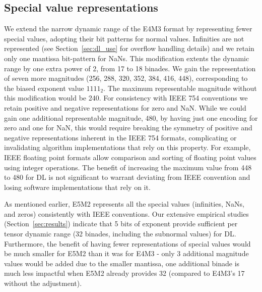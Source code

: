 \subsection{Special value representations}
\label{sec:special_values}
We extend the narrow dynamic range of the E4M3 format by representing fewer special values, adopting their bit patterns for normal values. Infinities are not represented (see Section~\ref{sec:dl_use} for overflow handling details) and we retain only one mantissa bit-pattern for NaNs. This modification extents the dynamic range by one extra power of 2, from 17 to 18 binades. We gain the representation of seven more magnitudes (256, 288, 320, 352, 384, 416, 448), corresponding to the biased exponent value $1111_{2}$. The maximum representable magnitude without this modification would be 240. For consistency with IEEE 754 conventions we retain positive and negative representations for zero and NaN. While we could gain one additional representable magnitude, 480, by having just one encoding for zero and one for NaN, this would require breaking the symmetry of positive and negative representations inherent in the IEEE 754 formats, complicating or invalidating algorithm implementations that rely on this property. For example, IEEE floating point formats allow comparison and sorting of floating point values using integer operations. The benefit of increasing the maximum value from 448 to 480 for DL is not significant to warrant deviating from IEEE convention and losing software implementations that rely on it.

As mentioned earlier, E5M2 represents all the special values (infinities, NaNs, and zeros) consistently with IEEE conventions. Our extensive empirical studies (Section~\ref{sec:results}) indicate that 5 bits of exponent provide sufficient per tensor dynamic range (32 binades, including the subnormal values) for DL. Furthermore, the benefit of having fewer representations of special values would be much smaller for E5M2 than it was for E4M3 - only 3 additional magnitude values would be added due to the smaller mantissa, one additional binade is much less impactful when E5M2 already provides 32 (compared to E4M3's 17 without the adjustment). 

